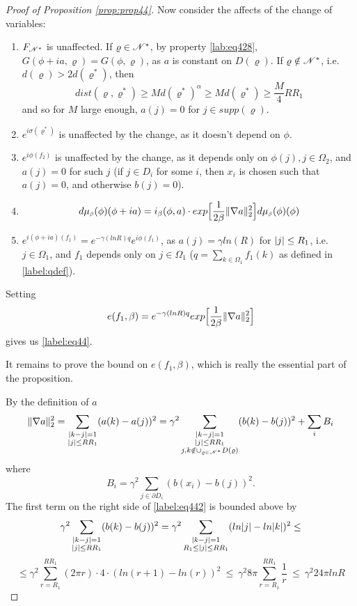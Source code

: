 \documentclass[11pt,reqno]{article}
\DeclarePairedDelimiter\abs{\lvert}{\rvert}%
\DeclarePairedDelimiter\norm{\lVert}{\rVert}%
\theoremstyle{definition}
\numberwithin{equation}{section}
\begin{document}
\begin{proof}[Proof of Proposition \eqref{prop:prop44}]
Now consider the affects of the change of variables:
\begin{enumerate}[label={\alph*)}]
\item $F_{\mathscr{N}^*}$ is unaffected. If $\varrho \in \mathscr{N}^*$, by property \eqref{lab:eq428}, $G(\phi+ia, \varrho) = G(\phi, \varrho)$, as $a$ is constant on $D(\varrho)$. If $\varrho \notin \mathscr{N}^*$, i.e. $d(\varrho) > 2d(\varrho^*)$, then
$$
dist(\varrho, \varrho^*) \geq Md(\varrho^*)^\alpha \geq Md(\varrho^*) \geq \frac{M}{4}RR_1
$$
and so for $M$ large enough, $a(j)=0$ for $j \in supp(\varrho)$.
\item $e^{i\sigma(\varrho^*)}$ is unaffected by the change, as it doesn't depend on $\phi$.
\item $ e^{i\phi(f_2)}$ is unaffected by the change, as it depends only on $\phi(j), j\in \Omega_2$, and $a(j)=0$ for such $j$ (if $j \in D_i$ for some $i$, then $x_i$ is chosen such that $a(j)=0$, and otherwise $b(j)=0$).
\item 
$$
\mida(\phi + ia) = i_\beta(\phi, a) \cdot exp\Big[\frac{1}{2\beta} \norm{\nabla a}_2^2 \Big]\mida(\phi)
$$
\item $e^{i(\phi + ia)(f_1)} = e^{-\gamma (lnR) q} e^{i\phi(f_1)}$, as $a(j)=\gamma ln(R)$ for $\abs{j} \leq R_1$, i.e. $j \in \Omega_1$, and $f_1$ depends only on $j \in \Omega_1$ ($q = \sum_{k \in \Omega_1}f_1(k)$ as defined in \eqref{label:qdef}).
\end{enumerate}
Setting 
$$
e(f_1, \beta) = e^{-\gamma (lnR) q} exp\Big[\frac{1}{2\beta} \norm{\nabla a}_2^2 \Big]
$$
gives us \eqref{label:eq44}.

It remains to prove the bound on $e(f_1, \beta)$, which is really the essential part of the proposition.

By the definition of $a$
\begin{equation} \label{label:eq442}
\norm{\nabla a}_2^2 = 
\sum_{\substack{\abs{k-j}=1 \\ \abs{j} \leq RR_1}}(a(k)-a(j))^2 =
\gamma^2 \sum_{\substack{\abs{k-j}=1 \\ \abs{j} \leq RR_1 \\ j,k \notin \cup_{\varrho \in \ens^*} D(\varrho)}}(b(k)-b(j))^2 + \sum_i B_i
\end{equation}
where
$$
B_i = \gamma^2 \sum_{j \in \partial D_i} (b(x_i) -b(j))^2.
$$
The first term on the right side of \eqref{label:eq442} is bounded above by
$$
\gamma^2 \sum_{\substack{\abs{k-j}=1 \\ \abs{j} \leq RR_1}} (b(k)-b(j))^2 =
\gamma^2 \sum_{\substack{\abs{k-j}=1 \\ R_1 \leq \abs{j} \leq RR_1}} (ln\abs{j} - ln\abs{k})^2 \leq
$$
\begin{equation} \label{label:eq444}
\leq \gamma^2 \sum_{r = R_1}^{RR_1} (2\pi r) \cdot 4 \cdot (ln(r+1)-ln(r))^2 \ \leq \ 
\gamma^2 8\pi \sum_{r = R_1}^{RR_1} \frac{1}{r} \ \leq \ \gamma^2 24\pi lnR
\end{equation}


\end{proof}
\end{document}
